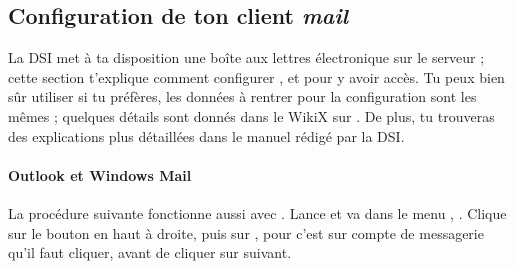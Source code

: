 




\subsection{Configuration de ton client \emph{mail}}

La DSI met \`a  ta disposition une bo\^{i}te aux lettres \'electronique sur
le serveur  ; cette section t'explique comment
configurer ,  et  pour y avoir acc\`es. Tu peux bien
s\^{u}r utiliser  si tu pr\'ef\`eres, les donn\'ees \`a  rentrer
pour la configuration sont les m\^emes ; quelques d\'etails sont donn\'es
dans le WikiX sur \fkz. De plus, tu trouveras des explications plus
d\'etaill\'ees dans le manuel r\'edig\'e par la DSI.

\paragraph{Outlook et Windows Mail}

La proc\'edure suivante fonctionne aussi avec .
Lance  et va dans le menu ,
. Clique sur le bouton  en
haut \`a  droite, puis sur , pour  c'est sur compte de messagerie qu'il faut cliquer, avant de cliquer sur suivant.

